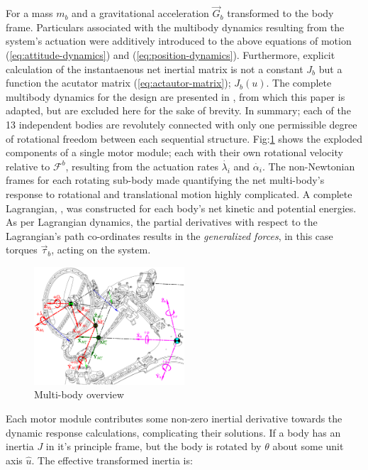 \documentclass[a4paper, 10pt, conference]{ieeeconf}
\begin{document}
For a mass $m_b$ and a gravitational acceleration $\vec{G}_b$ transformed to the body frame. Particulars associated with the multibody dynamics resulting from the system's actuation were additively introduced to the above equations of motion (\ref{eq:attitude-dynamics}) and (\ref{eq:position-dynamics}). Furthermore, explicit calculation of the instantaenous net inertial matrix is not a constant $J_b$ but a function the acutator matrix (\ref{eq:actautor-matrix}); $J_b(u)$. The complete multibody dynamics for the design are presented in \cite{dualaxistilting}, from which this paper is adapted, but are excluded here for the sake of brevity. In summary; each of the 13 independent bodies are revolutely connected with only one permissible degree of rotational freedom between each sequential structure. Fig:\ref{fig:response-body} shows the exploded components of a single motor module; each with their own rotational velocity relative to $\mathcal{F}^b$, resulting from the actuation rates $\dot{\lambda_i}$ and $\dot{\alpha_i}$. The non-Newtonian frames for each rotating sub-body made quantifying the net multi-body's response to rotational and translational motion highly complicated. A complete Lagrangian, \cite{lagrange}, was constructed for each body's net kinetic and potential energies. As per Lagrangian dynamics, the partial derivatives with respect to the Lagrangian's path co-ordinates results in the \emph{generalized forces}, in this case torques $\vec{\tau}_b$, acting on the system. 
\begin{figure}[bp]
\vspace{-15pt}
\centering
\includegraphics[width=0.5\textwidth]{figs/response-body}
\vspace{-22pt}
\caption{Multi-body overview}
\label{fig:response-body}
\vspace{-3pt}
\end{figure}
\newpage
Each motor module contributes some non-zero inertial derivative towards the dynamic response calculations, complicating their solutions. If a body has an inertia $J$ in it's principle frame, but the body is rotated by $\theta$ about some unit axis $\hat{u}$. The effective transformed inertia is:
\end{document}
